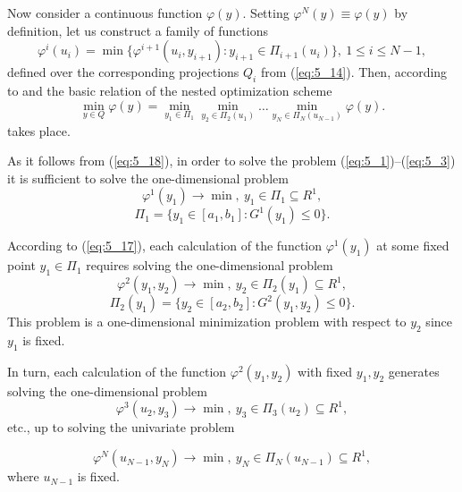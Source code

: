 Now consider  a continuous function $\varphi(y)$. Setting $\varphi^N(y)\equiv \varphi(y)$ by definition, let us construct a family of functions 
\begin{equation}
\label{eq:5_17}
\varphi^i(u_i)=\min\{\varphi^{i+1}(u_i,y_{i+1}):y_{i+1}\in \Pi_{i+1}(u_i)\},\:1\leq i\leq N-1,
\end{equation}
defined over the corresponding projections $Q_i$  from (\ref{eq:5_14}). Then, according to \cite{5_CarrHowe} and \cite{5_StrSergMon2000} the basic relation of the nested optimization scheme 
\begin{equation}
\label{eq:5_18}
\min_{y\in Q}\varphi(y)=\min_{y_1\in \Pi_1}\min_{y_2\in \Pi_2(u_1)}\ldots\min_{y_N\in \Pi_N(u_{N-1})}\varphi(y).
\end{equation}
takes place. 

As it follows from (\ref{eq:5_18}), in order to solve the problem (\ref{eq:5_1})--(\ref{eq:5_3}) it is sufficient to solve the one-dimensional problem 
\begin{equation}
\label{eq:5_19}
\varphi^1(y_1)\rightarrow \min,\:y_1\in \Pi_1\subseteq R^1,
\end{equation}
\begin{displaymath}
\Pi_1=\{y_1\in [a_1,b_1]:G^1(y_1)\leq 0\}.
\end{displaymath}

According to (\ref{eq:5_17}), each calculation of the function $\varphi^1(y_1)$  at some fixed point $y_1\in\Pi_1$   requires solving  the one-dimensional problem 
\begin{displaymath}
\varphi^2(y_1,y_2)\rightarrow \min,\:y_2\in \Pi_2(y_1)\subseteq R^1,
\end{displaymath}
\begin{displaymath}
\Pi_2(y_1)=\{y_2\in [a_2,b_2]:G^2(y_1,y_2)\leq 0\}.
\end{displaymath}
This problem is a one-dimensional minimization problem with respect to $y_2$  since $y_1$  is fixed.

In turn, each calculation of the function $\varphi^2(y_1,y_2)$  with fixed $y_1,y_2$ generates solving the one-dimensional problem
\begin{displaymath}
\varphi^3(u_2,y_3)\rightarrow \min,\:y_3\in \Pi_3(u_2)\subseteq R^1,
\end{displaymath}
etc., up to solving the univariate problem 

\begin{equation}
\label{eq:5_20}
\varphi^N(u_{N-1},y_N)\rightarrow \min,\:y_N\in \Pi_N(u_{N-1})\subseteq R^1,
\end{equation}
where $u_{N-1}$  is fixed.

